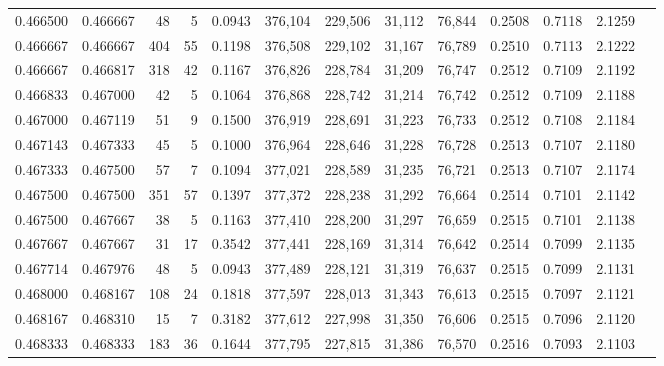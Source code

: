 \begin{tabular}{rrrrrrrrrrrrr}
0.466500 & 0.466667 &    48 &   5 &                                     0.0943 & 376,104 & 229,506 &  31,112 &  76,844 & 0.2508 & 0.7118 & 2.1259 \\
0.466667 & 0.466667 &   404 &  55 &                                     0.1198 & 376,508 & 229,102 &  31,167 &  76,789 & 0.2510 & 0.7113 & 2.1222 \\
0.466667 & 0.466817 &   318 &  42 &                                     0.1167 & 376,826 & 228,784 &  31,209 &  76,747 & 0.2512 & 0.7109 & 2.1192 \\
0.466833 & 0.467000 &    42 &   5 &                                     0.1064 & 376,868 & 228,742 &  31,214 &  76,742 & 0.2512 & 0.7109 & 2.1188 \\
0.467000 & 0.467119 &    51 &   9 &                                     0.1500 & 376,919 & 228,691 &  31,223 &  76,733 & 0.2512 & 0.7108 & 2.1184 \\
0.467143 & 0.467333 &    45 &   5 &                                     0.1000 & 376,964 & 228,646 &  31,228 &  76,728 & 0.2513 & 0.7107 & 2.1180 \\
0.467333 & 0.467500 &    57 &   7 &                                     0.1094 & 377,021 & 228,589 &  31,235 &  76,721 & 0.2513 & 0.7107 & 2.1174 \\
0.467500 & 0.467500 &   351 &  57 &                                     0.1397 & 377,372 & 228,238 &  31,292 &  76,664 & 0.2514 & 0.7101 & 2.1142 \\
0.467500 & 0.467667 &    38 &   5 &                                     0.1163 & 377,410 & 228,200 &  31,297 &  76,659 & 0.2515 & 0.7101 & 2.1138 \\
0.467667 & 0.467667 &    31 &  17 &                                     0.3542 & 377,441 & 228,169 &  31,314 &  76,642 & 0.2514 & 0.7099 & 2.1135 \\
0.467714 & 0.467976 &    48 &   5 &                                     0.0943 & 377,489 & 228,121 &  31,319 &  76,637 & 0.2515 & 0.7099 & 2.1131 \\
0.468000 & 0.468167 &   108 &  24 &                                     0.1818 & 377,597 & 228,013 &  31,343 &  76,613 & 0.2515 & 0.7097 & 2.1121 \\
0.468167 & 0.468310 &    15 &   7 &                                     0.3182 & 377,612 & 227,998 &  31,350 &  76,606 & 0.2515 & 0.7096 & 2.1120 \\
0.468333 & 0.468333 &   183 &  36 &                                     0.1644 & 377,795 & 227,815 &  31,386 &  76,570 & 0.2516 & 0.7093 & 2.1103 \\

\end{tabular}
